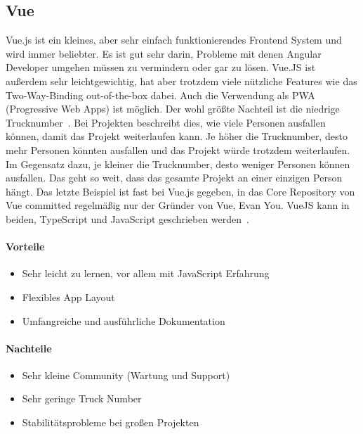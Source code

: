 \subsection{Vue}
\label{subsec:vue}
Vue.js ist ein kleines, aber sehr einfach funktionierendes Frontend System und wird immer beliebter.
Es ist gut sehr darin, Probleme mit denen Angular Developer umgehen müssen zu vermindern oder gar zu lösen.
Vue.JS ist außerdem sehr leichtgewichtig, hat aber trotzdem viele nützliche Features wie das Two-Way-Binding
out-of-the-box dabei.
Auch die Verwendung als PWA (Progressive Web Apps) ist möglich.
Der wohl größte Nachteil ist die niedrige Trucknumber~\cite{truck-factor-of-popular-github-projects, what-is-the-bus-factor}.
Bei Projekten beschreibt dies, wie viele Personen ausfallen können, damit das Projekt weiterlaufen kann.
Je höher die Trucknumber, desto mehr Personen könnten ausfallen und das Projekt würde trotzdem weiterlaufen.
Im Gegensatz dazu, je kleiner die Trucknumber, desto weniger Personen können ausfallen.
Das geht so weit, dass das gesamte Projekt an einer einzigen Person hängt.
Das letzte Beispiel ist fast bei Vue.js gegeben, in das Core Repository von Vue committed regelmäßig nur der Gründer
von Vue, Evan You.
VueJS kann in beiden, TypeScript und JavaScript geschrieben werden~\cite{best-frontend-frameworks, best-frontend-framework-2022, angular-vs-react-vs-vue}.

\paragraph{Vorteile}
\begin{itemize}
    \item Sehr leicht zu lernen, vor allem mit JavaScript Erfahrung
    \item Flexibles App Layout
    \item Umfangreiche und ausführliche Dokumentation
\end{itemize}

\paragraph{Nachteile}
\begin{itemize}
    \item Sehr kleine Community (Wartung und Support)
    \item Sehr geringe Truck Number
    \item Stabilitätsprobleme bei großen Projekten
\end{itemize}

